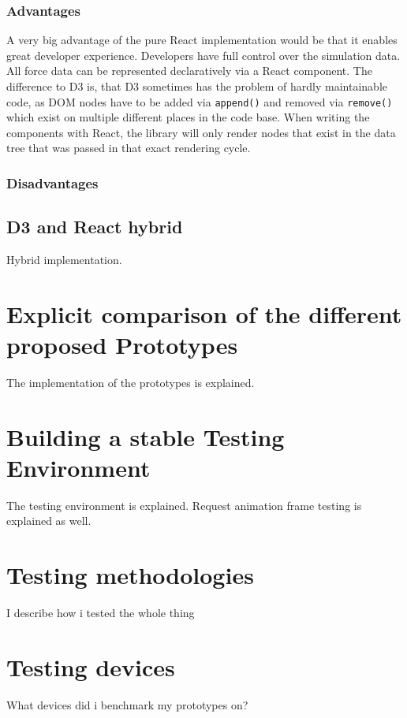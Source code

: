 \subsubsection{Advantages}

A very big advantage of the pure React implementation would be that it enables great developer experience. Developers have full control over the simulation data. All force data can be represented declaratively via a React component. The difference to D3 is, that D3 sometimes has the problem of hardly maintainable code, as DOM nodes have to be added via \texttt{append()} and removed via \texttt{remove()} which exist on multiple different places in the code base. When writing the components with React, the library will only render nodes that exist in the data tree that was passed in that exact rendering cycle.

\subsubsection{Disadvantages}


\subsection{D3 and React hybrid}


Hybrid implementation.

\section{Explicit comparison of the different proposed Prototypes}

The implementation of the prototypes is explained.

\section{Building a stable Testing Environment}

The testing environment is explained. Request animation frame testing is explained as well.

\section{Testing methodologies}

I describe how i tested the whole thing

\section{Testing devices}

What devices did i benchmark my prototypes on?
